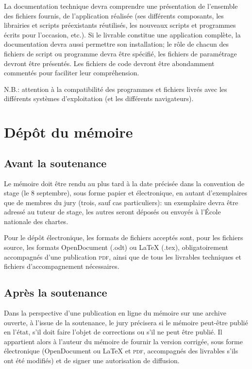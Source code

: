 \documentclass[a4paper,12pt]{book}
\begin{document}
La documentation technique devra  comprendre une présentation de l'ensemble des fichiers fournis, de l'application réalisée (ses différents composants, les librairies et scripts préexistants réutilisés, les nouveaux scripts et programmes écrits pour l'occasion, etc.). 
Si le livrable constitue une application complète, la documentation devra aussi permettre son installation; 
le rôle de chacun des fichiers de script ou programme devra être spécifié, les fichiers de paramétrage devront être présentés.
Les fichiers de code devront être abondamment commentés pour faciliter leur compréhension.

N.B.: attention à la compatibilité des programmes et fichiers livrés avec les différents systèmes d'exploitation (et les différents navigateurs).

\section{Dépôt du mémoire}

\subsection{Avant la soutenance}
Le mémoire doit être rendu au plus tard à la date précisée dans la convention de stage (le 8 septembre), sous forme papier et électronique, en autant  d'exemplaires que de membres du jury (trois, sauf cas particuliers): un exemplaire devra être adressé au tuteur de stage, les autres seront déposés ou envoyés à l'École nationale des chartes.

Pour le dépôt électronique, les formats de fichiers acceptés sont, pour les fichiers source, les formats OpenDocument (.odt) ou \LaTeX{} (.tex), obligatoirement accompagnés d'une \og publication \fg{} \textsc{pdf}, ainsi que de tous les livrables techniques et fichiers d'accompagnement nécessaires.

\subsection{Après la soutenance}

Dans la perspective d'une publication en ligne du mémoire sur une archive ouverte, à l'issue de la soutenance, le jury précisera si le mémoire peut-être publié en l'état, s'il doit faire l'objet de corrections ou s'il ne peut être publié. Il appartient alors à l'auteur du mémoire 
de fournir la version corrigée, sous forme électronique (OpenDocument ou \LaTeX{} et \textsc{pdf}, accompagnés des livrables s'ils ont été modifiés) et de signer une autorisation de diffusion.
\end{document}
